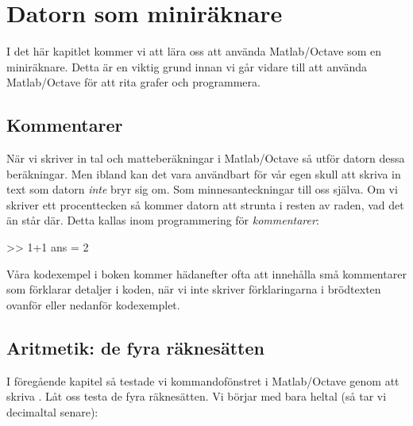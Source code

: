 %
%

\chapter{Datorn som miniräknare}\label{ch:datorn_som_raknemaskin}

I det här kapitlet kommer vi att lära oss att använda Matlab/Octave som en miniräknare. Detta är en viktig grund innan vi går vidare till att använda Matlab/Octave för att rita grafer och programmera.


\section{Kommentarer}

När vi skriver in tal och matteberäkningar i Matlab/Octave så utför datorn dessa beräkningar. Men ibland kan det vara användbart för vår egen skull att skriva in text som datorn \emph{inte} bryr sig om. Som minnesanteckningar till oss själva. Om vi skriver ett procenttecken \cw{\%} så kommer datorn att strunta i resten av raden, vad det än står där. Detta kallas inom programmering för \emph{kommentarer}:

\begin{matlab}[caption={Vår första kommentar},label={}]
>> 1+1 %
ans = 2
\end{matlab}

Våra kodexempel i boken kommer hädanefter ofta att innehålla små kommentarer som förklarar detaljer i koden, när vi inte skriver förklaringarna i brödtexten ovanför eller nedanför kodexemplet.
\newpage
\section{Aritmetik: de fyra räknesätten}
I föregående kapitel så testade vi kommandofönstret i Matlab/Octave genom att skriva . Låt oss testa de fyra räknesätten. Vi börjar med bara heltal (så tar vi decimaltal senare):

